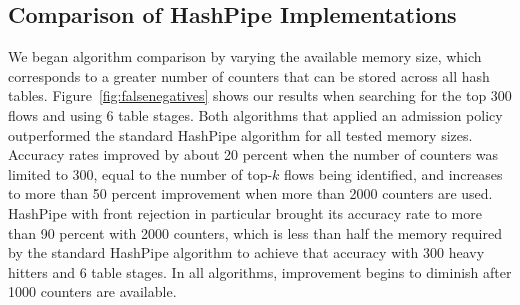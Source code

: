 \subsection{Comparison of HashPipe Implementations}
We began algorithm comparison by varying the available memory size, which corresponds to a greater number of counters that can be stored across all hash tables. Figure~\ref{fig:falsenegatives} shows our results when searching for the top 300 flows and using 6 table stages. Both algorithms that applied an admission policy outperformed the standard HashPipe algorithm for all tested memory sizes. Accuracy rates improved by about 20 percent when the number of counters was limited to 300, equal to the number of top-$k$ flows being identified, and increases to more than 50 percent improvement when more than 2000 counters are used. HashPipe with front rejection in particular brought its accuracy rate to more than 90 percent with 2000 counters, which is less than half the memory required by the standard HashPipe algorithm to achieve that accuracy with 300 heavy hitters and 6 table stages. In all algorithms, improvement begins to diminish after 1000 counters are available.
